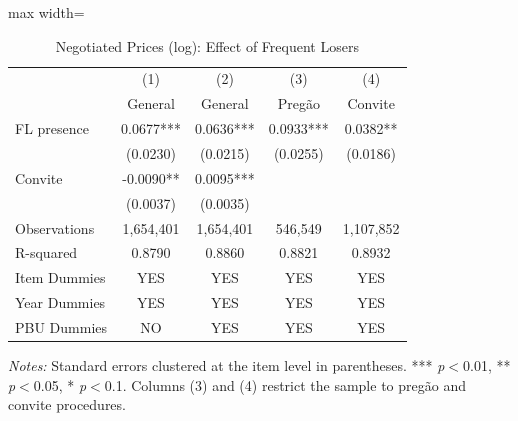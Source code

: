 \begin{table}[htbp]
\centering
\caption{Negotiated Prices (log): Effect of Frequent Losers}
\label{tab:prices}
\begin{adjustbox}{max width=\textwidth}
\begin{threeparttable}
\small
\begin{tabular}{lcccc}
\toprule
 & (1) & (2) & (3) & (4) \\
 & General & General & Preg\~{a}o & Convite \\
\midrule
FL presence & 0.0677*** & 0.0636*** & 0.0933*** & 0.0382** \\
 & (0.0230) & (0.0215) & (0.0255) & (0.0186) \\
Convite & -0.0090** & 0.0095*** &  &  \\
 & (0.0037) & (0.0035) &  &  \\
\midrule
Observations & 1,654,401 & 1,654,401 & 546,549 & 1,107,852 \\
R-squared & 0.8790 & 0.8860 & 0.8821 & 0.8932 \\
Item Dummies & YES & YES & YES & YES \\
Year Dummies & YES & YES & YES & YES \\
PBU Dummies & NO & YES & YES & YES \\
\bottomrule
\end{tabular}
\begin{tablenotes}
\small
\item \textit{Notes:} Standard errors clustered at the item level in parentheses. *** \textit{p}$<$0.01, ** \textit{p}$<$0.05, * \textit{p}$<$0.1. Columns (3) and (4) restrict the sample to preg\~{a}o and convite procedures.
\end{tablenotes}
\end{threeparttable}
\end{adjustbox}
\end{table}
